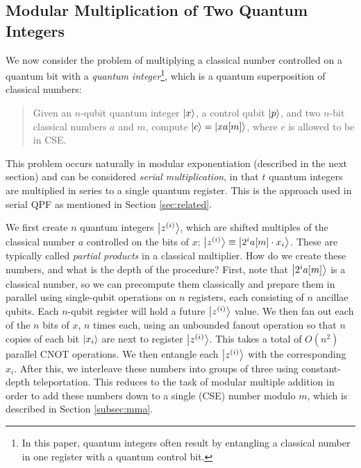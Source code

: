 \subsection{Modular Multiplication of Two Quantum Integers}
\label{subsec:csa-mod-mult-qq}

We now consider the problem of multiplying a classical number controlled
on a quantum bit with a
\emph{quantum integer}\footnote{In this paper, quantum integers often result by entangling a classical number in one register with a quantum control bit.},
which is a
quantum superposition of classical numbers:

\begin{quote}
Given an $n$-qubit quantum integer $\left\vert{x}\right\rangle$, a control qubit $\left\vert{p}\right\rangle$,
and two $n$-bit classical numbers $a$
and $m$,
compute $\left\vert{c}\right\rangle = \left\vert{xa[m]}\right\rangle$, where $c$ is allowed to be in CSE.
\end{quote}

This problem occurs naturally in modular exponentiation (described in
the next section) and can be considered \emph{serial multiplication},
in that $t$ quantum integers are multiplied in series to a single
quantum register. This is the approach used in serial QPF as mentioned in
Section \ref{sec:related}.


We first create $n$ quantum integers $\left\vert{z^{(i)}}\right\rangle$,
which are shifted multiples of the classical number $a$ controlled on the bits
of $x$:
$\left\vert{z^{(i)}}\right\rangle \equiv \left\vert{2^i a[m] \cdot x_i }\right\rangle$.
These are typically called \emph{partial products} in a classical multiplier.
How do we create these numbers, and what is the depth of the procedure?
First, note that $\left\vert{2^i a[m]}\right\rangle$ is a classical number, so we can
precompute them classically and prepare them in parallel using single-qubit
operations
on $n$ registers, each consisting of $n$ ancillae qubits. Each $n$-qubit
register will hold a future $\left\vert{z^{(i)}}\right\rangle$ value.
We then fan out each of the
$n$ bits of $x$, $n$ times each, using an unbounded fanout operation so that
$n$ copies of each bit $\left\vert{x_i}\right\rangle$ are next to register $\left\vert{z^{(i)}}\right\rangle$.
This takes a total of $O(n^2)$ parallel CNOT operations.
We then entangle each $\left\vert{z^{(i)}}\right\rangle$ with the corresponding $x_i$.
After this, we interleave these numbers into groups of three using
constant-depth teleportation. This reduces to the task of modular
multiple addition in order to add these numbers down to a single
(CSE) number modulo $m$, which is described in Section \ref{subsec:mma}.

